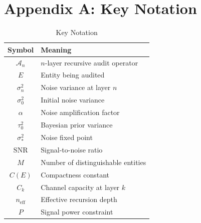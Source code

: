 \documentclass[12pt,a4paper]{article}
\theoremstyle{definition}
\newcommand{\AuditOp}{\mathcal{A}}
\newcommand{\SNR}{\mathrm{SNR}}
\begin{document}

\section*{Appendix A: Key Notation}

\begin{table}[htbp]
\centering
\caption{Key Notation}
\label{tab:notation}
\begin{tabular}{@{}cl@{}}
\toprule
\textbf{Symbol} & \textbf{Meaning} \\
\midrule
$\AuditOp_n$ & $n$-layer recursive audit operator \\
$E$ & Entity being audited \\
$\sigma_n^2$ & Noise variance at layer $n$ \\
$\sigma_0^2$ & Initial noise variance \\
$\alpha$ & Noise amplification factor \\
$\tau_0^2$ & Bayesian prior variance \\
$\sigma_*^2$ & Noise fixed point \\
$\SNR$ & Signal-to-noise ratio \\
$M$ & Number of distinguishable entities \\
$C(E)$ & Compactness constant \\
$C_k$ & Channel capacity at layer $k$ \\
$n_{\text{eff}}$ & Effective recursion depth \\
$P$ & Signal power constraint \\
\bottomrule
\end{tabular}
\end{table}

\end{document}
